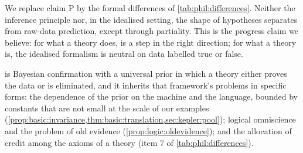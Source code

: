 We replace claim P by the formal differences of \cref{tab:phil:differences}. Neither the inference principle nor, in the idealised setting, the shape of hypotheses separates \SAIabbr from raw-data prediction, except through partiality. This is the progress claim we believe: for what a theory does, \SAIabbr is a step in the right direction; for what a theory is, the idealised formalism is neutral on data labelled true or false.

\SAIabbr is Bayesian confirmation with a universal prior in which a theory either proves the data or is eliminated, and it inherits that framework's problems in specific forms: the dependence of the prior on the machine and the language, bounded by constants that are not small at the scale of our examples (\cref{prop:basic:invariance,thm:basic:translation,sec:kepler:pool}); logical omniscience and the problem of old evidence (\cref{prop:logic:oldevidence}); and the allocation of credit among the axioms of a theory (item 7 of \cref{tab:phil:differences}).
